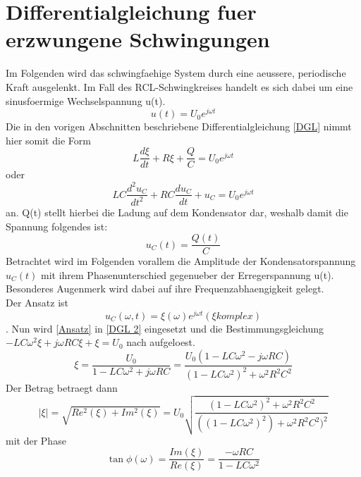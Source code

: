 \documentclass[titlepage=firstcover, captions=tableheading]{scrartcl}
\begin{document}
\section{Differentialgleichung fuer erzwungene Schwingungen}
Im Folgenden wird das schwingfaehige System durch eine aeussere, periodische Kraft ausgelenkt. Im Fall des RCL-Schwingkreises handelt es sich dabei um eine sinusfoermige Wechselspannung u(t).
\begin{equation}
    u(t)=U_0e^{j\omega t}\nonumber
\end{equation}
Die in den vorigen Abschnitten beschriebene Differentialgleichung \ref{DGL} nimmt hier somit die Form
\begin{equation}
    L\frac{d\xi}{dt}+R\xi+\frac{Q}{C}=U_0e^{j\omega t}\nonumber
\end{equation}
oder 
\begin{equation}\label{DGL 2}
    LC\frac{d^2u_C}{dt^2}+RC\frac{du_C}{dt}+u_C=U_0e^{j\omega t}
\end{equation}
an. 
Q(t) stellt hierbei die Ladung auf dem Kondensator dar, weshalb damit die Spannung folgendes ist:
\begin{equation}
    u_C(t)=\frac{Q(t)}{C}\nonumber
\end{equation}
Betrachtet wird im Folgenden vorallem die Amplitude der Kondensatorspannung $u_C(t)$ mit ihrem Phasenunterschied gegenueber der Erregerspannung u(t). Besonderes Augenmerk wird dabei auf ihre Frequenzabhaengigkeit gelegt.\\
Der Ansatz ist
\begin{equation}\label{Ansatz}
    u_C(\omega, t)=\xi(\omega)e^{j\omega t} (\xi komplex) 
\end{equation}.
Nun wird \ref{Ansatz} in \ref{DGL 2} eingesetzt und die Bestimmungsgleichung $-LC\omega^2\xi+j\omega RC\xi+\xi=U_0$ nach \xi aufgeloest.
\begin{equation}
    \xi=\frac{U_0}{1-LC\omega^2+j\omega RC}=\frac{U_0(1-LC\omega^2-j\omega RC)}{(1-LC\omega^2)^2+\omega^2R^2C^2} \nonumber
\end{equation}
Der Betrag betraegt dann 
\begin{equation}\label{Betrag}
    |\xi|=\sqrt{Re^2(\xi)+Im^2(\xi)}=U_0\sqrt{\frac{(1-LC\omega^2)^2+\omega^2R^2C^2}{((1-LC\omega^2)^2)+\omega^2R^2C^2)^2}}
\end{equation}
mit der Phase
\begin{equation}
    \tan \phi(\omega)=\frac{Im(\xi)}{Re(\xi)}=\frac{-\omega RC}{1-LC\omega^2}\nonumber
\end{equation}
\end{document}
